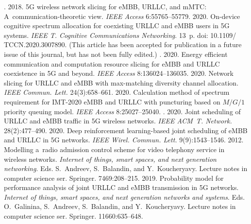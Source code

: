   \begin{multicols}{2}

\renewcommand{\bibname}{\protect\rmfamily References}

{\small\frenchspacing
 {%
 \begin{thebibliography}{9}

. 2018. 5G wireless
 network slicing for \mbox{eMBB}, URLLC, and mMTC: A~communication-theoretic view. \textit{IEEE Access} 
 6:55765--55779.
 2020. On-device cognitive spectrum 
allocation for coexisting URLLC and \mbox{eMBB} users in 5G systems. \textit{IEEE T. Cognitive 
Communications  Networking}.  13~p. doi: 10.1109/ \mbox{TCCN}.2020.3007890.
(This article has been accepted for publication in a future issue of this journal, but 
has not been fully edited.)
. 2020. Energy 
efficient communication and computation resource slicing for \mbox{eMBB} and URLLC coexistence in 5G and beyond. 
\textit{IEEE Access} 8:136024--136035.
 2020.  Network 
slicing for URLLC and \mbox{eMBB} with max-matching diversity channel allocation. \textit{IEEE Commun. Lett.} 24(3):658--661.
 2020. Calculation method of spectrum requirement for IMT-2020 
\mbox{eMBB} and URLLC with puncturing based on $M/G/1$ priority queuing model. \textit{IEEE Access} 8:25027--25040.
. 2020. Joint scheduling of URLLC and \mbox{eMBB} traffic 
in 5G wireless networks. \textit{IEEE ACM~T. Network.} 28(2):477--490.
 2020. Deep reinforcement learning-based joint scheduling of \mbox{eMBB} 
and URLLC in 5G networks. \textit{IEEE Wirel. Commun. Lett.} 9(9):1543--1546.
 2012. Modelling a~radio admission control scheme 
for video telephony service in wireless networks. \textit{Internet of things, smart spaces, and 
next generation networking}. Eds. S.~Andreev, S.~Balandin, and Y.~Koucheryavy. Lecture notes in 
computer science ser. Springer. 7469:208--215.
 2019. Probability model for performance 
analysis of joint URLLC and \mbox{eMBB} transmission in 5G networks. \textit{Internet of things, smart spaces, 
and next generation networks and systems}. Eds. O.~Galinina, S.~Andreev, S.~Balandin, and Y.~Koucheryavy. 
Lecture notes in computer science ser. Springer. 11660:635--648.
{

}
\end{thebibliography}

 }
 }

\end{multicols}

